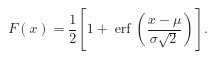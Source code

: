 \begin{equation*}[niji]
 F(x)=\frac12\left[
 1+\operatorname{erf}\left(
 \frac{x-\mu}{\sigma\sqrt2}
 \right)\right].
\end{equation*}
